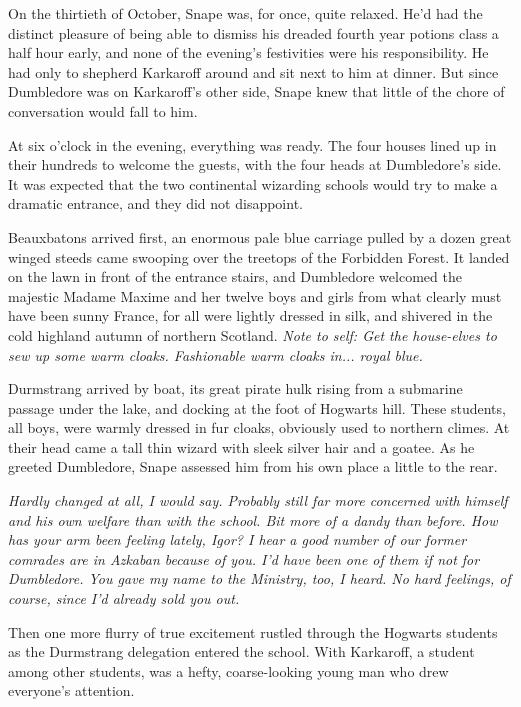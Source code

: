 On the thirtieth of October, Snape was, for once, quite relaxed. He'd had the distinct pleasure of being able to dismiss his dreaded fourth year potions class a half hour early, and none of the evening's festivities were his responsibility. He had only to shepherd Karkaroff around and sit next to him at dinner. But since Dumbledore was on Karkaroff's other side, Snape knew that little of the chore of conversation would fall to him.

At six o'clock in the evening, everything was ready. The four houses lined up in their hundreds to welcome the guests, with the four heads at Dumbledore's side. It was expected that the two continental wizarding schools would try to make a dramatic entrance, and they did not disappoint.

Beauxbatons arrived first, an enormous pale blue carriage pulled by a dozen great winged steeds came swooping over the treetops of the Forbidden Forest. It landed on the lawn in front of the entrance stairs, and Dumbledore welcomed the majestic Madame Maxime and her twelve boys and girls from what clearly must have been sunny France, for all were lightly dressed in silk, and shivered in the cold highland autumn of northern Scotland. \emph{Note to self: Get the house-elves to sew up some warm cloaks. Fashionable warm cloaks in... royal blue.}

Durmstrang arrived by boat, its great pirate hulk rising from a submarine passage under the lake, and docking at the foot of Hogwarts hill. These students, all boys, were warmly dressed in fur cloaks, obviously used to northern climes. At their head came a tall thin wizard with sleek silver hair and a goatee. As he greeted Dumbledore, Snape assessed him from his own place a little to the rear.

\emph{Hardly changed at all, I would say. Probably still far more concerned with himself and his own welfare than with the school. Bit more of a dandy than before. How has your arm been feeling lately, Igor? I hear a good number of our former comrades are in Azkaban because of you. I'd have been one of them if not for Dumbledore. You gave my name to the Ministry, too, I heard. No hard feelings, of course, since I'd already sold you out.}

Then one more flurry of true excitement rustled through the Hogwarts students as the Durmstrang delegation entered the school. With Karkaroff, a student among other students, was a hefty, coarse-looking young man who drew everyone's attention.

